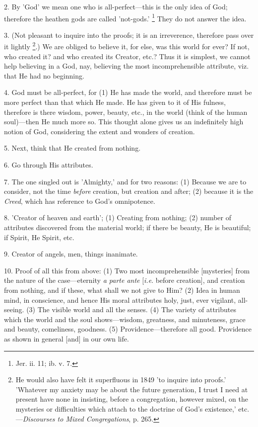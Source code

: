 2. By 'God' we mean one who is all-perfect—this
is the only idea of God; therefore the heathen gods are called
'not-gods.' \footnote{Jer. ii. 11; ib. v. 7.} They do not
answer the idea.

3. (Not pleasant to inquire into the proofs; it
is an irreverence, therefore pass over it lightly \footnote{He would also have felt it
superfluous in 1849 'to inquire into proofs.' 'Whatever my anxiety may
be about the future generation, I trust I need at present have none in
insisting, before a congregation, however mixed, on the mysteries or
difficulties which attach to the doctrine of God's existence,' etc.—\emph{Discourses
to Mixed Congregations}, p. 265.}.) We are obliged to believe it, for else, was this world for
ever? If not, who created it? and who created its Creator, etc.? Thus
it is simplest, we cannot help believing in a God, nay, believing the
most incomprehensible attribute, viz. that He had no beginning.

4. God must be all-perfect, for (1) He has made
the world, and therefore must be more perfect than that which He made.
He has given to it of His fulness, therefore is there wisdom, power,
beauty, etc., in the world (think of the human soul)—then He much
more so. This thought alone gives us an indefinitely high notion of
God, considering the extent and wonders of creation.

5. Next, think that He created from nothing.

6. Go through His attributes.

7. The one singled out is 'Almighty,' and for two
reasons: (1) Because we are to consider, not the time \emph{before}
creation, but creation and after; (2) because it is the \emph{Creed},
which has reference to God's omnipotence.

8. 'Creator of heaven and earth'; (1) Creating
from nothing; (2) number of attributes discovered from the material
world; if there be beauty, He is beautiful; if Spirit, He Spirit, etc.

9. Creator of angels, men, things inanimate.

10. Proof of all this from above: (1) Two most
incomprehensible [mysteries] from the nature of the
case—eternity \emph{a parte ante} [\emph{i.e}. before creation], and
creation from nothing, and if these, what shall we not give to Him?
(2) Idea in human mind, in conscience, and hence His moral attributes
holy, just, ever vigilant, all-seeing. (3) The visible world and all
the senses. (4) The variety of attributes which the world and the soul
shows—wisdom, greatness, and minuteness, grace and beauty,
comeliness, goodness. (5) Providence—therefore all good. Providence
as shown in general [and] in our own life.

